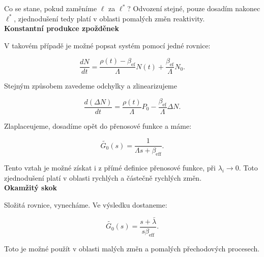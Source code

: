 Co se stane, pokud zaměníme $\ell$ za $\ell^*$? Odvození stejné, pouze dosadím nakonec $\ell^*$, zjednodušení tedy platí v oblasti pomalých změn reaktivity.\\

\textbf{Konstantní produkce zpožděnek}

V takovém případě je možné popsat systém pomocí jedné rovnice:

$$ \dfrac{dN}{dt} = \dfrac{\rho(t) - \beta_{\text{ef}}}{\Lambda} N(t) + \dfrac{\beta_{\text{ef}}}{\Lambda} N_0. $$

Stejným způsobem zavedeme odchylky a zlinearizujeme

$$ \dfrac{d (\Delta N)}{dt} = \dfrac{\rho(t)}{\Lambda} P_0 - \dfrac{\beta_{\text{ef}}}{\Lambda} \Delta N. $$

Zlaplaceujeme, dosadíme opět do přenosové funkce a máme:

$$ \tilde{G_0} (s) = \dfrac{1}{\Lambda s +  \beta_{\text{eff}}}. $$

Tento vztah je možné získat i z přímé definice přenosové funkce, při $\lambda_i \rightarrow 0$. Toto zjednodušení platí v oblasti rychlých a částečně rychlých změn.\\

\textbf{Okamžitý skok}

Složitá rovnice, vynecháme. Ve výsledku dostaneme:

$$ \tilde{G_0} (s) = \dfrac{s+\bar{\lambda}}{s \beta_{\text{eff}}}. $$

Toto je možné použít v oblasti malých změn a pomalých přechodových procesech.